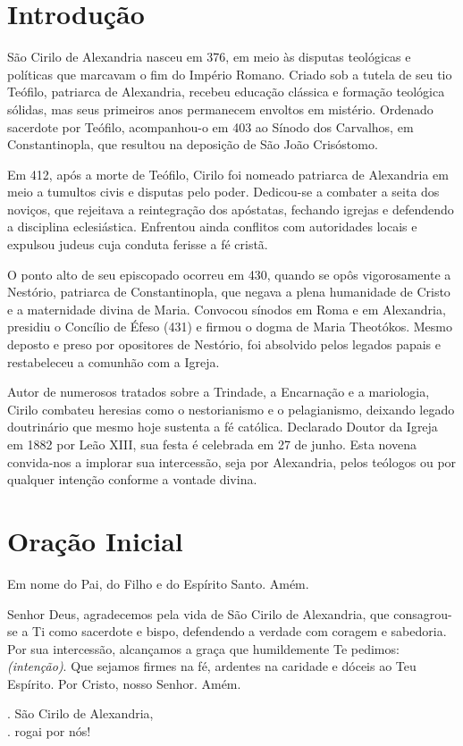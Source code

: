 \documentclass[18pt]{article}
\makeatletter
\newcommand{\vers@resp@sym}{%
  \raisebox{0.2ex}{\rotatebox[origin=c]{-20}{$\m@th\rceil$}}%
}
\newcommand{\vers@resp}[2]{%
  {\ooalign{%
     \hidewidth\kern#1\vers@resp@sym\hidewidth\cr
     #2\cr
  }}%
}
\DeclareRobustCommand{\versicle}{\vers@resp{-0.1em}{V}}
\DeclareRobustCommand{\response}{\vers@resp{0pt}{R}}
\makeatother
\begin{document}
\section{Introdução}
\begin{justify}
São Cirilo de Alexandria nasceu em 376, em meio às disputas teológicas e políticas que marcavam o fim do Império Romano. Criado sob a tutela de seu tio Teófilo, patriarca de Alexandria, recebeu educação clássica e formação teológica sólidas, mas seus primeiros anos permanecem envoltos em mistério. Ordenado sacerdote por Teófilo, acompanhou-o em 403 ao Sínodo dos Carvalhos, em Constantinopla, que resultou na deposição de São João Crisóstomo.

Em 412, após a morte de Teófilo, Cirilo foi nomeado patriarca de Alexandria em meio a tumultos civis e disputas pelo poder. Dedicou-se a combater a seita dos noviços, que rejeitava a reintegração dos apóstatas, fechando igrejas e defendendo a disciplina eclesiástica. Enfrentou ainda conflitos com autoridades locais e expulsou judeus cuja conduta ferisse a fé cristã.

O ponto alto de seu episcopado ocorreu em 430, quando se opôs vigorosamente a Nestório, patriarca de Constantinopla, que negava a plena humanidade de Cristo e a maternidade divina de Maria. Convocou sínodos em Roma e em Alexandria, presidiu o Concílio de Éfeso (431) e firmou o dogma de Maria Theotókos. Mesmo deposto e preso por opositores de Nestório, foi absolvido pelos legados papais e restabeleceu a comunhão com a Igreja.

Autor de numerosos tratados sobre a Trindade, a Encarnação e a mariologia, Cirilo combateu heresias como o nestorianismo e o pelagianismo, deixando legado doutrinário que mesmo hoje sustenta a fé católica. Declarado Doutor da Igreja em 1882 por Leão XIII, sua festa é celebrada em 27 de junho. Esta novena convida-nos a implorar sua intercessão, seja por Alexandria, pelos teólogos ou por qualquer intenção conforme a vontade divina.
\end{justify}

\newpage

\section{Oração Inicial}
\begin{justify}
Em nome do Pai, do Filho e do Espírito Santo. Amém.

Senhor Deus, agradecemos pela vida de São Cirilo de Alexandria, que consagrou-se a Ti como sacerdote e bispo, defendendo a verdade com coragem e sabedoria. Por sua intercessão, alcançamos a graça que humildemente Te pedimos: \textit{(intenção)}. Que sejamos firmes na fé, ardentes na caridade e dóceis ao Teu Espírito. Por Cristo, nosso Senhor. Amém.

\vspace{0.5cm}

\noindent
\versicle. São Cirilo de Alexandria,\\
\response. rogai por nós!
\end{justify}
\end{document}
